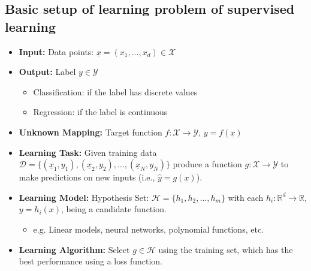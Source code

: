 \subsection{Basic setup of learning problem of supervised learning}
\begin{definition}
    \begin{itemize}
        \item \textbf{Input:} Data points: $\underline{x} = (x_1, \dots, x_d) \in \mathcal{X}$ 
        \item \textbf{Output:} Label $y \in \mathcal{Y}$ 
        \begin{itemize}
            \item Classification: if the label has discrete values 
            \item Regression: if the label is continuous 
        \end{itemize}
        \item \textbf{Unknown Mapping:} Target function $f: \mathcal{X} \rightarrow \mathcal{Y}$, $y = f(\underline{x})$ 
        \item \textbf{Learning Task:} Given training data $\mathcal{D} = \{ (\underline{x}_1, y_1), (\underline{x}_2, y_2), \dots, (\underline{x}_N, y_N) \}$  produce a function $g: \mathcal{X} \rightarrow \mathcal{Y}$ to make predictions on new inputs (i.e., $\hat{y} = g(\underline{x})$).
        \item \textbf{Learning Model:} Hypothesis Set: $\mathcal{H} = \{h_1, h_2, \dots, h_m\}$ with each $h_i: \mathbb{R}^d \rightarrow \mathbb{R}$, $y = h_i(x)$, being a candidate function.
        \begin{itemize}
            \item e.g. Linear models, neural networks, polynomial functions, etc.
        \end{itemize}
        \item \textbf{Learning Algorithm:} Select $g \in \mathcal{H}$ using the training set, which has the best performance using a loss function.
    \end{itemize}

\end{definition}

